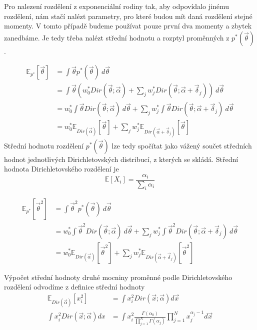 Pro nalezení rozdělení z exponenciální rodiny tak, aby odpovídalo jinému
rozdělení, nám stačí nalézt parametry, pro které budou mít daná rozdělení
stejné momenty. V tomto případě budeme používat pouze první dva momenty a
zbytek zanedbáme. Je tedy třeba nalézt střední hodnotu a rozptyl
proměnných z $p^*(\vec\theta)$.

\begin{align}
\mathbb{E}_{p^*}[\vec\theta] &= \int \vec\theta p^*(\vec\theta) ~ d\vec\theta
\\
&= \int \vec\theta (
	w_0^* Dir(\vec{\theta}; \vec{\alpha}) +
	\sum_j w^*_j
        	Dir(\vec{\theta}; \vec{\alpha} + \vec{\delta}_j)
	) ~ d\vec\theta
\\
&= w_0^* \int \vec\theta Dir(\vec{\theta}; \vec{\alpha}) ~ d\vec\theta +
	\sum_j w_j^* \int \vec\theta Dir(\vec{\theta}; \vec{\alpha} + \vec{\delta}_j)
	 ~ d\vec\theta
\\
&= w_0^* \mathbb{E}_{Dir(\vec\alpha)}[\vec\theta] +
	\sum_j w_j^* \mathbb{E}_{Dir(\vec\alpha + \vec{\delta}_j)}[\vec\theta]
\end{align}
Střední hodnotu rozdělení $p^*(\vec\theta)$ lze tedy spočítat jako vážený součet středních hodnot jednotlivých Dirichletovských distribucí,
z kterých se skládá.
Střední hodnota Dirichletovského rozdělení je
\begin{equation}
\mathbb{E}[X_i] = \frac{\alpha_i}{\sum_i \alpha_i}
\end{equation}

\begin{align}
\mathbb{E}_{p^*}[\vec\theta^2] &= \int \vec\theta^2 p^*(\vec\theta) ~ d\vec\theta
\\
&= w_0^* \int \vec\theta^2 Dir(\vec{\theta}; \vec{\alpha}) ~ d\vec\theta +
	\sum_j w_j^* \int \vec\theta^2 Dir(\vec{\theta}; \vec{\alpha} + \vec{\delta}_j)
	 ~ d\vec\theta
\\
&= w_0^* \mathbb{E}_{Dir(\vec\alpha)}[\vec\theta^2] +
	\sum_j w_j^* \mathbb{E}_{Dir(\vec\alpha + \vec{\delta}_j)}[\vec\theta^2]
\end{align}

Výpočet střední hodnoty druhé mocniny proměnné podle Dirichletovského rozdělení odvodíme z definice střední hodnoty
\begin{align}
\mathbb{E}_{Dir(\vec\alpha)}[x_i^2] &=
	\int x_i^2 Dir(\vec x; \vec\alpha) d\vec x
\\
\int x_i^2 Dir(\vec x; \vec\alpha) dx &= 
	\int x_i^2 \frac{\Gamma(\alpha_0)}
			   {\prod_{j=1}^N \Gamma(\alpha_j)}
		\prod_{j=1}^N x_j^{\alpha_j - 1} d\vec x
\end{align}

